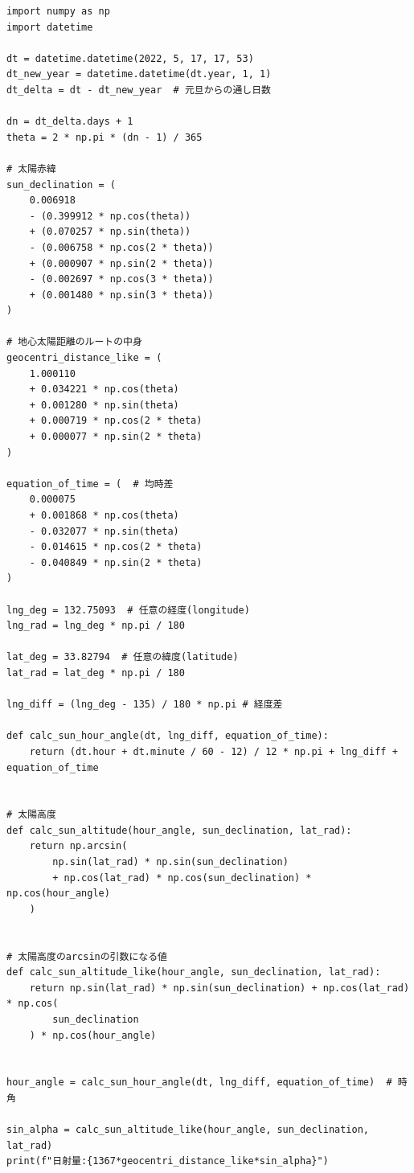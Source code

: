 \documentclass[a4j,12pt,]{jarticle}
\begin{document}
\begin{lstlisting}[caption=任意の緯度経度と日時から日射量を計算するプログラム, label=sc1]
import numpy as np
import datetime

dt = datetime.datetime(2022, 5, 17, 17, 53)
dt_new_year = datetime.datetime(dt.year, 1, 1)
dt_delta = dt - dt_new_year  # 元旦からの通し日数

dn = dt_delta.days + 1
theta = 2 * np.pi * (dn - 1) / 365

# 太陽赤緯
sun_declination = (
    0.006918
    - (0.399912 * np.cos(theta))
    + (0.070257 * np.sin(theta))
    - (0.006758 * np.cos(2 * theta))
    + (0.000907 * np.sin(2 * theta))
    - (0.002697 * np.cos(3 * theta))
    + (0.001480 * np.sin(3 * theta))
)

# 地心太陽距離のルートの中身
geocentri_distance_like = (
    1.000110
    + 0.034221 * np.cos(theta)
    + 0.001280 * np.sin(theta)
    + 0.000719 * np.cos(2 * theta)
    + 0.000077 * np.sin(2 * theta)
)

equation_of_time = (  # 均時差
    0.000075
    + 0.001868 * np.cos(theta)
    - 0.032077 * np.sin(theta)
    - 0.014615 * np.cos(2 * theta)
    - 0.040849 * np.sin(2 * theta)
)

lng_deg = 132.75093  # 任意の経度(longitude)
lng_rad = lng_deg * np.pi / 180

lat_deg = 33.82794  # 任意の緯度(latitude)
lat_rad = lat_deg * np.pi / 180

lng_diff = (lng_deg - 135) / 180 * np.pi # 経度差

def calc_sun_hour_angle(dt, lng_diff, equation_of_time):
    return (dt.hour + dt.minute / 60 - 12) / 12 * np.pi + lng_diff + equation_of_time


# 太陽高度
def calc_sun_altitude(hour_angle, sun_declination, lat_rad):
    return np.arcsin(
        np.sin(lat_rad) * np.sin(sun_declination)
        + np.cos(lat_rad) * np.cos(sun_declination) * np.cos(hour_angle)
    )


# 太陽高度のarcsinの引数になる値
def calc_sun_altitude_like(hour_angle, sun_declination, lat_rad):
    return np.sin(lat_rad) * np.sin(sun_declination) + np.cos(lat_rad) * np.cos(
        sun_declination
    ) * np.cos(hour_angle)


hour_angle = calc_sun_hour_angle(dt, lng_diff, equation_of_time)  # 時角

sin_alpha = calc_sun_altitude_like(hour_angle, sun_declination, lat_rad)
print(f"日射量:{1367*geocentri_distance_like*sin_alpha}")
\end{lstlisting}
\end{document}
